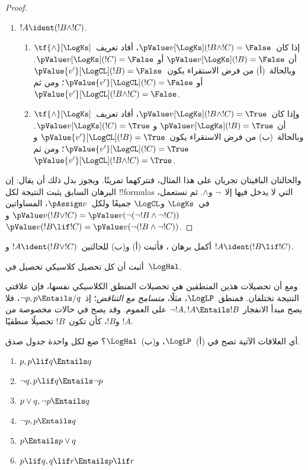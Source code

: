 \documentclass[../../../include/open-logic-section]{subfiles}
\begin{document}
\begin{proof}
\begin{enumerate}
    \item $!A \ident (!B \land !C)$.
    \begin{enumerate}
      \item إذا كان~$\pValue v[\LogKs](!B \land !C) = \False$،
      أفاد تعريف~$\tf{\land}[\LogKs]$ أن
      $\pValue v[\LogKs](!B) = \False$ أو
      $\pValue v[\LogKs](!C) = \False$. وبالحالة~(أ) من فرض
      الاستقراء يكون~$\pValue {v'}[\LogCL](!B) = \False$ أو
      $\pValue {v'}[\LogCL](!C) = \False$؛ ومن ثم
      $\pValue {v'}[\LogCL](!B \land !C) = \False$.
      \item وإذا كان~$\pValue v[\LogKs](!B \land !C) = \True$،
      أفاد تعريف~$\tf{\land}[\LogKs]$ أن
      $\pValue v[\LogKs](!B) = \True$ و
      $\pValue v[\LogKs](!C) = \True$. وبالحالة~(ب) من فرض
      الاستقراء يكون~$\pValue {v'}[\LogCL](!B) = \True$ و
      $\pValue {v'}[\LogCL](!C) = \True$؛ ومن ثم
      $\pValue {v'}[\LogCL](!B \land !C) = \True$.
    \end{enumerate}
  \end{enumerate}

  والحالتان الباقيتان تجريان على هذا المثال، فنتركهما تمرينًا.
  ويجوز بدل ذلك أن يقال: إن البرهان السابق يثبت النتيجة لكل
  !!{formula}s التي لا يدخل فيها إلا~$\lnot$ و$\land$. ثم نستعمل،
  في~$\LogKs$ و$\LogCL$ جميعًا ولكل~$\pAssign v$، المساواتين
  $\pValue v(!B \lor !C) = \pValue v(\lnot(\lnot!B \land \lnot !C))$
  و$\pValue v(!B \lif !C) = \pValue v(\lnot(!B \land \lnot !C))$.
\end{proof}

\begin{prob}
  أكمل برهان ، فأثبت (أ)
  و(ب) للحالتين~$!A \ident (!B \lor !C)$ و
  $!A \ident (!B \lif !C)$.
\end{prob}

\begin{prob}
أثبت أن كل تحصيل كلاسيكي تحصيل في~$\LogHal$.
\end{prob}

ومع أن تحصيلات هذين المنطقين هي تحصيلات المنطق الكلاسيكي نفسها، فإن
علاقتي النتيجة تختلفان. فمنطق~$\LogLP$، مثلًا، \emph{متسامح مع
التناقض}؛ إذ~$\lnot p, p \Entails/ q$، فلا يصح مبدأ الانفجار
$\lnot !A, !A \Entails !B$ على العموم. وقد يصح في حالات مخصوصة من
$!A$ و$!B$، كأن تكون~$!B$ تحصيلًا منطقيًا.

\begin{prob}
  أي العلاقات الآتية تصح في (أ)~$\LogLP$، و(ب)~$\LogHal$؟ ضع لكل
  واحدة جدول صدق.
  \begin{enumerate}
    \item $p, p \lif q \Entails q$
    \item $\lnot q, p \lif q \Entails \lnot p$
    \item $p \lor q, \lnot p \Entails q$
    \item $\lnot p, p \Entails q$
    \item $p \Entails p \lor q$
    \item $p \lif q, q\lif r \Entails p \lif r$
  \end{enumerate}
\end{prob}
\end{document}

